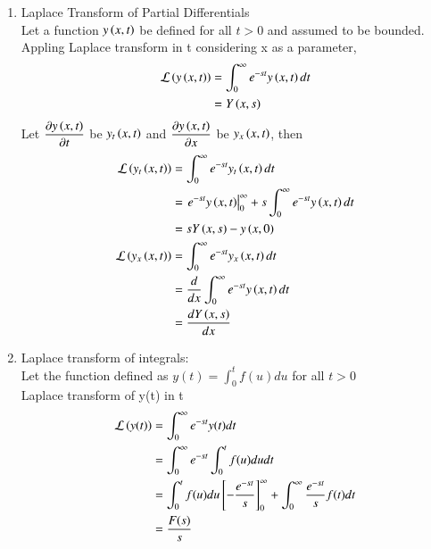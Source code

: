 \begin{enumerate}[label=\thechapter.\arabic*,ref=\thechapter.\theenumi]
\item Laplace Transform of Partial Differentials\\
Let a function $y\left(x,t\right)$ be defined for all $t>0$ and assumed to be bounded. Appling Laplace transform in t considering x as a parameter,
\begin{align}
 \mathcal{L}\left(y\left(x,t\right)\right) &= \int_{0}^{\infty}e^{-st}y\left(x,t\right)dt\\
 &= Y\left(x,s\right)
\end{align}
Let $\dfrac{\partial y\left(x,t\right)}{\partial t}$ be $y_t\left(x,t\right)$ and $\dfrac{\partial y\left(x,t\right)}{\partial x}$ be $y_x\left(x,t\right)$, then
\begin{align}
 \mathcal{L}\left(y_t\left(x,t\right)\right) &= \int_{0}^{\infty}e^{-st}y_t\left(x,t\right)dt\\
 &= \left. e^{-st}y\left(x,t\right)\right|_{0}^{\infty} + s\int_{0}^{\infty}e^{-st} y\left(x,t\right) dt\\
 &= sY\left(x,s\right) - y\left(x,0\right) \label{L(y_t(x,t))}\\
 \mathcal{L}\left(y_x\left(x,t\right)\right) &= \int_{0}^{\infty}e^{-st}y_x\left(x,t\right)dt\\
 &= \dfrac{d}{dx}\int_{0}^{\infty}e^{-st}y\left(x,t\right)dt \label{L(y_x(x,t))}\\
 &= \dfrac{dY\left(x,s\right)}{dx}
\end{align}

\item Laplace transform of integrals:\\
Let the function defined as $y(t) = \int_0^t f(u) du$ for all $t > 0$\\
Laplace transform of y(t) in t 
\begin{align}
    \mathcal{L} \left(y(t)\right) &= \int_0^{\infty} e^{-st} y(t) dt\\
    &= \int_0^{\infty} e^{-st} \int_0^t f(u) du dt\\
    &= \int_0^t f(u) du {}\left[- \frac{e^{-st}}{s}\right]_0^{\infty} + \int_0^{\infty} \frac{e^{-st}}{s} f(t) dt\\
    &= \frac{F(s)}{s}
\end{align}

\end{enumerate}
